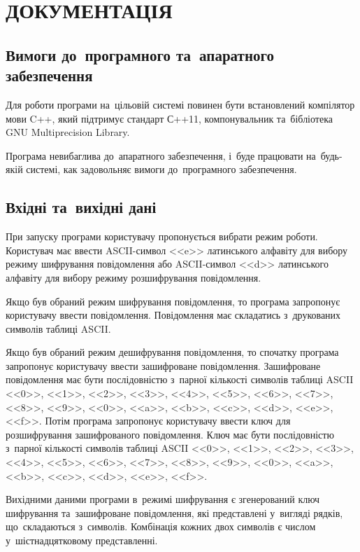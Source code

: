 \documentclass[a4paper,oneside,titlepage,14pt]{extarticle}
\begin{document}
	\section{ДОКУМЕНТАЦІЯ}
		\subsection{Вимоги до~програмного та~апаратного забезпечення}
			Для роботи програми на~цільовій системі повинен бути встановлений компілятор мови C++, який підтримує стандарт С++11, компонувальник та~бібліотека GNU Multiprecision Library.\par
			Програма невибаглива до~апаратного забезпечення, і~буде працювати на~будь-якій системі, как задовольняє вимоги до~програмного забезпечення.\par
		\subsection{Вхідні та~вихідні дані}
			\label{ssec:inputandoutput}
			При запуску програми користувачу пропонується вибрати режим роботи. Користувач має ввести ASCII-символ <<e>> латинського алфавіту для вибору режиму шифрування повідомлення або ASCII-символ <<d>> латинського алфавіту для вибору режиму розшифрування повідомлення.\par
			Якщо був обраний режим шифрування повідомлення, то програма запропонує користувачу ввести повідомлення. Повідомлення має складатись з~друкованих символів таблиці ASCII.\par
			Якщо був обраний режим дешифрування повідомлення, то спочатку програма запропонує користувачу ввести зашифроване повідомлення. Зашифроване повідомлення має бути послідовністю з~парної кількості символів таблиці ASCII <<0>>, <<1>>, <<2>>, <<3>>, <<4>>, <<5>>, <<6>>, <<7>>, <<8>>, <<9>>, <<0>>, <<a>>, <<b>>, <<c>>, <<d>>, <<e>>, <<f>>. Потім програма запропонує користувачу ввести ключ для розшифрування зашифрованого повідомлення. Ключ має бути послідовністю з~парної кількості символів таблиці ASCII <<0>>, <<1>>, <<2>>, <<3>>, <<4>>, <<5>>, <<6>>, <<7>>, <<8>>, <<9>>, <<0>>, <<a>>, <<b>>, <<c>>, <<d>>, <<e>>, <<f>>.\par
			Вихідними даними програми в~режимі шифрування є згенерований ключ шифрування та~зашифроване повідомлення, які представлені у~вигляді рядків, що~складаються з~символів. Комбінація кожних двох символів є числом у~шістнадцятковому представленні.\par
\end{document}
